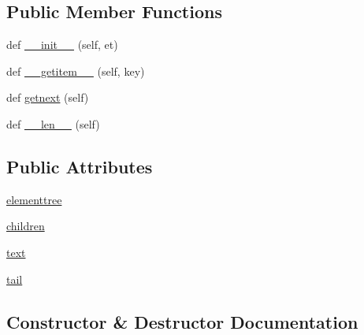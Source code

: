 \subsection*{Public Member Functions}
\begin{DoxyCompactItemize}
\item 
def \hyperlink{classpip_1_1__vendor_1_1html5lib_1_1treewalkers_1_1etree__lxml_1_1Root_a13f10dabfec5006e1b6c1693c9e47ba4}{\+\_\+\+\_\+init\+\_\+\+\_\+} (self, et)
\item 
def \hyperlink{classpip_1_1__vendor_1_1html5lib_1_1treewalkers_1_1etree__lxml_1_1Root_a372359f72472efc28e967c982a2db0ae}{\+\_\+\+\_\+getitem\+\_\+\+\_\+} (self, key)
\item 
def \hyperlink{classpip_1_1__vendor_1_1html5lib_1_1treewalkers_1_1etree__lxml_1_1Root_a6492da44daa40f8286e308887e6ed99f}{getnext} (self)
\item 
def \hyperlink{classpip_1_1__vendor_1_1html5lib_1_1treewalkers_1_1etree__lxml_1_1Root_a824e394c8846c2e40026d73cd3355e88}{\+\_\+\+\_\+len\+\_\+\+\_\+} (self)
\end{DoxyCompactItemize}
\subsection*{Public Attributes}
\begin{DoxyCompactItemize}
\item 
\hyperlink{classpip_1_1__vendor_1_1html5lib_1_1treewalkers_1_1etree__lxml_1_1Root_af64ba95ad052b5ca4cc32000cd27930e}{elementtree}
\item 
\hyperlink{classpip_1_1__vendor_1_1html5lib_1_1treewalkers_1_1etree__lxml_1_1Root_a782277f3178a1f3ae19a717d5da70d3a}{children}
\item 
\hyperlink{classpip_1_1__vendor_1_1html5lib_1_1treewalkers_1_1etree__lxml_1_1Root_ac83058033a132aca427fd0c116d9ace4}{text}
\item 
\hyperlink{classpip_1_1__vendor_1_1html5lib_1_1treewalkers_1_1etree__lxml_1_1Root_a2a7b096c525a02d64b50685ad1ed3991}{tail}
\end{DoxyCompactItemize}


\subsection{Constructor \& Destructor Documentation}
\mbox{\label{classpip_1_1__vendor_1_1html5lib_1_1treewalkers_1_1etree__lxml_1_1Root_a13f10dabfec5006e1b6c1693c9e47ba4}} 
